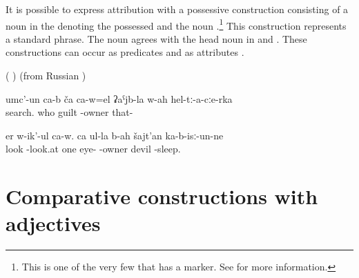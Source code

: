 It is possible to express attribution with a possessive construction consisting of a noun in the  denoting the possessed and the noun  .\footnote{This is one of the very few  that has a  marker. See  for more information.} This construction represents a standard  phrase. The noun agrees with the head noun in  and . These constructions can occur as predicates  and as attributes .
%
\begin{exe}
	\ex	\label{ex:adjectivesWithBAH}
	\begin{xlist}
		\ex	{}  ( )
		\ex	{} 
		\ex	{}  (from Russian  )
	\end{xlist}
\end{exe}

\begin{exe}
	\ex	\label{ex:They are searching for who among them is guilty}
	\gll	umc'-un ca-b	ča 	ca-w=el	ʡaˁjb-la	w-ah	hel-tː-a-cːe-rka \\
		search. 	who		guilt	-owner	that- \\
	\glt	{}

	\ex	\label{ex:He is looking around}
	\gll	er w-ik'-ul ca-w.	ca	ul-la	b-ah	šajt'an	ka-b-isː-un-ne \\
		look -look.at 	 one	eye-	-owner	devil	-sleep. \\
	\glt	{}
\end{exe}



\section{Comparative constructions with adjectives}
\label{sec:Comparison}

